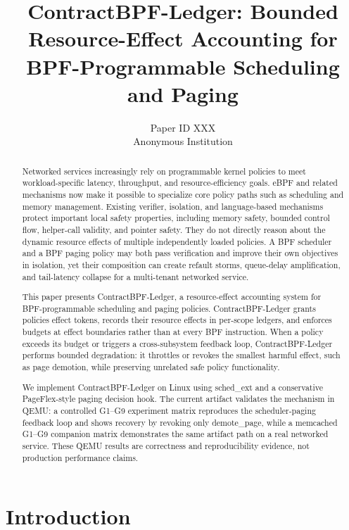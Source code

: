 \documentclass[letterpaper,twocolumn,10pt]{article}
\title{\bf ContractBPF-Ledger: Bounded Resource-Effect Accounting for BPF-Programmable Scheduling and Paging}
\author{Paper ID XXX\\Anonymous Institution}
\date{}
\newcommand{\sys}{ContractBPF-Ledger\xspace}
\begin{document}
\maketitle

\begin{abstract}
Networked services increasingly rely on programmable kernel policies to meet workload-specific latency, throughput, and resource-efficiency goals. eBPF and related mechanisms now make it possible to specialize core policy paths such as scheduling and memory management. Existing verifier, isolation, and language-based mechanisms protect important local safety properties, including memory safety, bounded control flow, helper-call validity, and pointer safety. They do not directly reason about the dynamic resource effects of multiple independently loaded policies. A BPF scheduler and a BPF paging policy may both pass verification and improve their own objectives in isolation, yet their composition can create refault storms, queue-delay amplification, and tail-latency collapse for a multi-tenant networked service.

This paper presents \sys, a resource-effect accounting system for BPF-programmable scheduling and paging policies. \sys grants policies effect tokens, records their resource effects in per-scope ledgers, and enforces budgets at effect boundaries rather than at every BPF instruction. When a policy exceeds its budget or triggers a cross-subsystem feedback loop, \sys performs bounded degradation: it throttles or revokes the smallest harmful effect, such as page demotion, while preserving unrelated safe policy functionality.

We implement \sys on Linux using sched\_ext and a conservative PageFlex-style paging decision hook. The current artifact validates the mechanism in QEMU: a controlled G1--G9 experiment matrix reproduces the scheduler-paging feedback loop and shows recovery by revoking only demote\_page, while a memcached G1--G9 companion matrix demonstrates the same artifact path on a real networked service. These QEMU results are correctness and reproducibility evidence, not production performance claims.
\end{abstract}

\section{Introduction}
\end{document}
